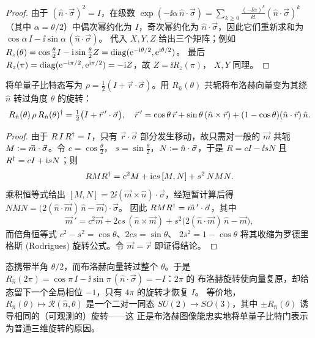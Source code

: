 \begin{proof}
由于 $(\hat n\cdot\vec\sigma)^{2}=I$，在级数
$\exp(-\ii\alpha\,\hat n\cdot\vec\sigma)=\sum_{k\ge0}\tfrac{(-\ii\alpha)^{k}}{k!}(\hat n\cdot\vec\sigma)^{k}$
（其中 $\alpha=\theta/2$）中偶次幂约化为 $I$，奇次幂约化为
$\hat n\cdot\vec\sigma$，因此它们重新求和为 $\cos\alpha\,I-\ii\sin\alpha\,(\hat n\cdot\vec\sigma)$。
代入 $X,Y,Z$ 给出三个矩阵；例如
$R_z(\theta)=\cos\tfrac{\theta}{2}I-\mathrm{i}\sin\tfrac{\theta}{2}Z=\operatorname{diag}(\mathrm{e}^{-\mathrm{i}\theta/2},\mathrm{e}^{\mathrm{i}\theta/2})$。
最后 $R_z(\pi)=\operatorname{diag}(\mathrm{e}^{-\mathrm{i}\pi/2},\mathrm{e}^{\mathrm{i}\pi/2})=-\mathrm{i} Z$，故 $Z=\ii R_z(\pi)$，
$X,Y$ 同理。
\end{proof}

\begin{proposition}\label{prop:lec01-rodrigues}
将单量子比特态写为 $\rho=\tfrac12(I+\vec r\cdot\vec\sigma)$。用 $R_{\hat n}(\theta)$
共轭将布洛赫向量变为其绕 $\hat n$ 转过角度 $\theta$ 的旋转：
\[
  R_{\hat n}(\theta)\,\rho\,R_{\hat n}(\theta)^{\dagger}=\tfrac12\big(I+\vec r\,'\cdot\vec\sigma\big),
  \quad
  \vec r\,'=\cos\theta\,\vec r+\sin\theta\,(\hat n\times\vec r)+(1-\cos\theta)(\hat n\cdot\vec r)\,\hat n .
\]
\end{proposition}

\begin{proof}
由于 $R\,I\,R^{\dagger}=I$，只有 $\vec r\cdot\vec\sigma$ 部分发生移动，故只需对一般的
$\vec m$ 共轭 $M\vcentcolon=\vec m\cdot\vec\sigma$。令 $c=\cos\tfrac{\theta}{2}$，
$s=\sin\tfrac{\theta}{2}$，$N\vcentcolon=\hat n\cdot\vec\sigma$，于是 $R=cI-\ii sN$ 且
$R^{\dagger}=cI+\mathrm{i} sN$；则
\[
  RMR^{\dagger}=c^{2}M+\mathrm{i} cs\,[M,N]+s^{2}\,NMN .
\]
乘积恒等式给出 $[M,N]=2\ii(\vec m\times\hat n)\cdot\vec\sigma$，经短暂计算后得
$NMN=\big(2(\hat n\cdot\vec m)\,\hat n-\vec m\big)\cdot\vec\sigma$。
因此 $RMR^{\dagger}=\vec m\,'\cdot\vec\sigma$，其中
\[
  \vec m\,'=c^{2}\vec m+2cs\,(\hat n\times\vec m)+s^{2}\big(2(\hat n\cdot\vec m)\,\hat n-\vec m\big),
\]
而倍角恒等式 $c^{2}-s^{2}=\cos\theta$、$2cs=\sin\theta$、
$2s^{2}=1-\cos\theta$ 将其收缩为罗德里格斯 (Rodrigues) 旋转公式。令
$\vec m=\vec r$ 即证得结论。
\end{proof}

\begin{remark}\label{rem:lec01-doublecover}
态携带半角 $\theta/2$，而布洛赫向量转过整个 $\theta$。于是
$R_{\hat n}(2\pi)=\cos\pi\,I-\ii\sin\pi\,(\hat n\cdot\vec\sigma)=-I$：$2\pi$ 的
布洛赫旋转使向量复原，却给态留下一个全局相位 $-1$，只有 $4\pi$ 的旋转才恢复 $I$。
等价地，$R_{\hat n}(\theta)\mapsto\mathcal R(\hat n,\theta)$ 是一个二对一同态
$SU(2)\to SO(3)$，其中 $\pm R_{\hat n}(\theta)$ 诱导相同的（可观测的）旋转——这
正是布洛赫图像能忠实地将单量子比特门表示为普通三维旋转的原因。
\end{remark}

